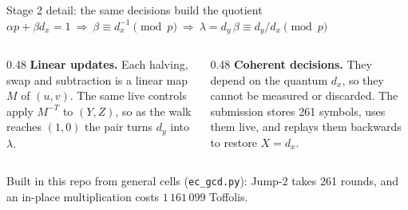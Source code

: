 \documentclass[aspectratio=169,11pt]{beamer}
\begin{document}
\begin{frame}{Stage 2 detail: the same decisions build the quotient}
  \centering
  $\alpha p+\beta d_x=1\ \Longrightarrow\ \beta\equiv d_x^{-1}\pmod p\ \Longrightarrow\ \lambda=d_y\,\beta\equiv d_y/d_x\pmod p$\par
  \vskip3mm
  \par
  \vskip3mm
  \raggedright
  \begin{columns}[T]
    \begin{column}{0.48\textwidth}
      \small \textbf{Linear updates.} Each halving, swap and subtraction is a linear map $M$ of $(u,v)$. The same live controls apply $M^{-T}$ to $(Y,Z)$, so as the walk reaches $(1,0)$ the pair turns $d_y$ into $\lambda$.
    \end{column}
    \begin{column}{0.48\textwidth}
      \small \textbf{Coherent decisions.} They depend on the quantum $d_x$, so they cannot be measured or discarded. The submission stores 261 symbols, uses them live, and replays them backwards to restore $X=d_x$.
    \end{column}
  \end{columns}
  \vskip2mm
  {\small Built in this repo from general cells (\texttt{ec\_gcd.py}): Jump-2 takes 261 rounds, and an in-place multiplication costs $1\,161\,099$ Toffolis.}
\end{frame}
\end{document}

